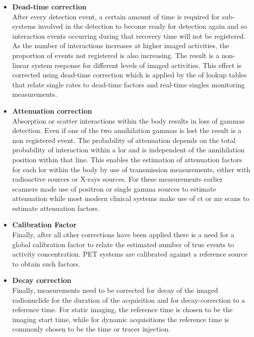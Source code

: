 \begin{itemize}
\item\textbf{Dead-time correction}\\
After every detection event, a certain amount of time is required for sub-systems involved in the detection to become ready for detection again and so interaction events occurring during that recovery time will not be registered. As the number of interactions increases at higher imaged activities, the proportion of events not registered is also increasing. The result is a non-linear system response for different levels of imaged activities. This effect is corrected using dead-time correction which is applied by the of lookup tables that relate single rates to dead-time factors and real-time singles monitoring measurements.
\item\textbf{Attenuation correction}\\
Absorption or scatter interactions within the body results in loss of gammas detection. Even if one of the two annihilation gammas is lost the result is a non registered event. The probability of attenuation depends on the total probability of interaction within a \gls{lor} and is independent of the annihilation position within that line. This enables the estimation of attenuation factors for each \gls{lor} within the body by use of transmission measurements, either with radioactive sources or X-rays sources. For these measurements earlier scanners made use of positron or single gamma sources to estimate attenuation while most modern clinical systems make use of \gls{ct} or \gls{mr} scans to estimate attenuation factors. 
\item\textbf{Calibration Factor}\\
Finally, after all other corrections have been applied there is a need for a global calibration factor to relate the estimated number of true events to activity concentration. 
PET systems are calibrated against a reference source to obtain such factors. 
\item\textbf{Decay correction}\\
Finally, measurements need to be corrected for decay of the imaged radionuclide for the duration of the acquisition and for decay-correction to a reference time. 
For static imaging, the reference time is chosen to be the imaging start time, while for dynamic acquisitions the reference time is commonly chosen to be the time or tracer injection. 
\end{itemize}

